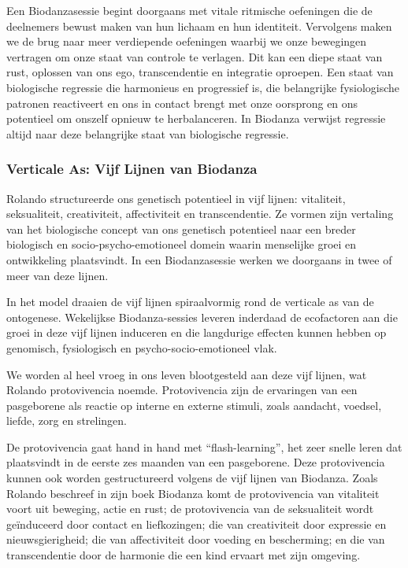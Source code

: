 \documentclass[
  11pt,
]{book}
\begin{document}
Een Biodanzasessie begint doorgaans met vitale ritmische oefeningen die de deelnemers bewust maken van hun lichaam en hun identiteit. Vervolgens maken we de brug naar meer verdiepende oefeningen waarbij we onze bewegingen vertragen om onze staat van controle te verlagen. Dit kan een diepe staat van rust, oplossen van ons ego, transcendentie en integratie oproepen. Een staat van biologische regressie die harmonieus en progressief is, die belangrijke fysiologische patronen reactiveert en ons in contact brengt met onze oorsprong en ons potentieel om onszelf opnieuw te herbalanceren. In Biodanza verwijst regressie altijd naar deze belangrijke staat van biologische regressie.

\subsubsection{Verticale As: Vijf Lijnen van Biodanza}\label{verticale-as-vijf-lijnen-van-biodanza}

Rolando structureerde ons genetisch potentieel in vijf lijnen: vitaliteit, seksualiteit, creativiteit, affectiviteit en transcendentie. Ze vormen zijn vertaling van het biologische concept van ons genetisch potentieel naar een breder biologisch en socio-psycho-emotioneel domein waarin menselijke groei en ontwikkeling plaatsvindt. In een Biodanzasessie werken we doorgaans in twee of meer van deze lijnen.

In het model draaien de vijf lijnen spiraalvormig rond de verticale as van de ontogenese. Wekelijkse Biodanza-sessies leveren inderdaad de ecofactoren aan die groei in deze vijf lijnen induceren en die langdurige effecten kunnen hebben op genomisch, fysiologisch en psycho-socio-emotioneel vlak.

We worden al heel vroeg in ons leven blootgesteld aan deze vijf lijnen, wat Rolando protovivencia noemde. Protovivencia zijn de ervaringen van een pasgeborene als reactie op interne en externe stimuli, zoals aandacht, voedsel, liefde, zorg en strelingen.

De protovivencia gaat hand in hand met ``flash-learning'', het zeer snelle leren dat plaatsvindt in de eerste zes maanden van een pasgeborene. Deze protovivencia kunnen ook worden gestructureerd volgens de vijf lijnen van Biodanza. Zoals Rolando beschreef in zijn boek Biodanza \citep{toro2008} komt de protovivencia van vitaliteit voort uit beweging, actie en rust; de protovivencia van de seksualiteit wordt geïnduceerd door contact en liefkozingen; die van creativiteit door expressie en nieuwsgierigheid; die van affectiviteit door voeding en bescherming; en die van transcendentie door de harmonie die een kind ervaart met zijn omgeving.
\end{document}
